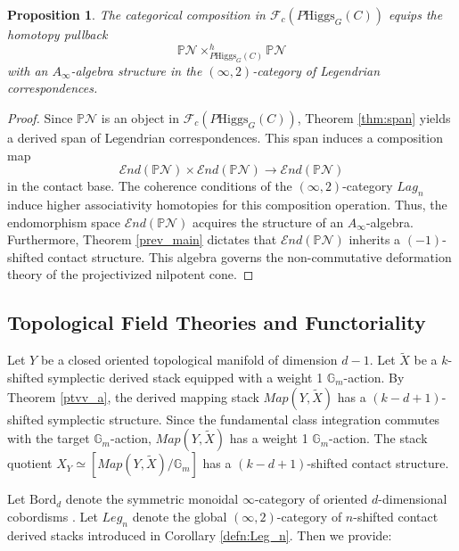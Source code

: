 \documentclass[reqno]{amsart}
\newcommand{\Gm}{\mathbb{G}_m}
\newtheorem{proposition}[theorem]{Proposition}
\begin{document}
\begin{proposition}\label{prop: nilpotentcone}
The categorical composition in $\mathcal{F}_{c}(P\mathrm{Higgs}_G(C))$ equips the homotopy pullback
\[
    \mathbb{P}\mathcal{N} \times_{P\mathrm{Higgs}_G(C)}^h \mathbb{P}\mathcal{N}
\]
with an $A_\infty$-algebra structure in the $(\infty, 2)$-category of Legendrian correspondences.
\end{proposition}
\begin{proof}
Since $\mathbb{P}\mathcal{N}$ is an object in $\mathcal{F}_{c}(P\mathrm{Higgs}_G(C))$, Theorem \ref{thm:span} yields a derived span of Legendrian correspondences. This span induces a composition map
\[
    \mathcal{E}nd(\mathbb{P}\mathcal{N}) \times \mathcal{E}nd(\mathbb{P}\mathcal{N}) \to \mathcal{E}nd(\mathbb{P}\mathcal{N})
\]
in the contact base. The coherence conditions of the $(\infty, 2)$-category $Lag_{n}$ induce higher associativity homotopies for this composition operation. Thus, the endomorphism space $\mathcal{E}nd(\mathbb{P}\mathcal{N})$ acquires the structure of an $A_\infty$-algebra. Furthermore, Theorem \ref{prev_main} dictates that $\mathcal{E}nd(\mathbb{P}\mathcal{N})$ inherits a $(-1)$-shifted contact structure. This algebra governs the non-commutative deformation theory of the projectivized nilpotent cone.

\end{proof}

\subsection{Topological Field Theories and Functoriality}
Let $Y$ be a closed oriented topological manifold of dimension $d-1$. Let $\widetilde{X}$ be a $k$-shifted symplectic derived stack equipped with a weight 1 $\Gm$-action. By Theorem \ref{ptvv_a}, the derived mapping stack $Map(Y, \widetilde{X})$ has a $(k-d+1)$-shifted symplectic structure. Since the fundamental class integration commutes with the target $\Gm$-action, $Map(Y, \widetilde{X})$ has a weight 1 $\Gm$-action. The stack quotient $X_Y \simeq [Map(Y, \widetilde{X}) / \Gm]$ has a $(k-d+1)$-shifted contact structure.

Let $\mathrm{Bord}_d$ denote the symmetric monoidal $\infty$-category of oriented $d$-dimensional cobordisms \cite[Section 1.2]{CHS}. Let $Leg_{n}$ denote the global $(\infty, 2)$-category of $n$-shifted contact derived stacks introduced in Corollary \ref{defn:Leg_n}. Then we provide:
\end{document}
